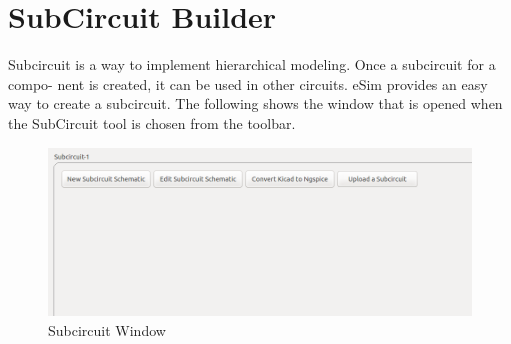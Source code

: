 \chapter{SubCircuit Builder}
\label{chap8}
Subcircuit is a way to implement hierarchical modeling. Once a subcircuit for a compo-
nent is created, it can be used in other circuits. eSim provides an easy way to create
a subcircuit. The following  shows the window that is opened when the SubCircuit tool is chosen from the toolbar.
\begin{figure}[!htp]
\centering
\includegraphics[width =\lgfig]{subcirciut_window.png}
\caption{Subcircuit Window}
\label{subcircuit_mainwin}
\end{figure}


